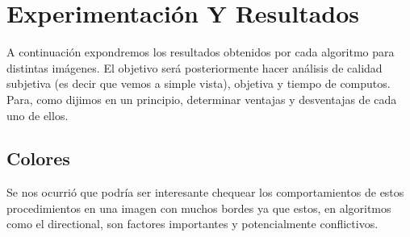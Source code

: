 \section{Experimentación Y Resultados}

A continuación expondremos los resultados obtenidos por cada algoritmo para distintas imágenes. El objetivo será posteriormente hacer análisis de calidad subjetiva (es decir que vemos a simple vista), objetiva y tiempo de computos. Para, como dijimos en un principio, determinar ventajas y desventajas de cada uno de ellos.

\subsection{Colores}

Se nos ocurrió que podría ser interesante chequear los comportamientos de estos procedimientos en una imagen con muchos bordes ya que estos, en algoritmos como el directional, son factores importantes y potencialmente conflictivos.

